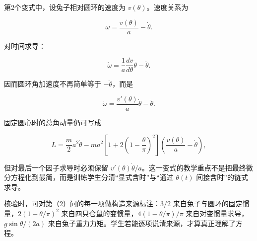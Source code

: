 \documentclass[12pt,a4paper,UTF8]{ctexart}
\begin{document}
第2个变式中，设兔子相对圆环的速度为 \(v(\theta)\)。速度关系为

\[\omega=\frac{v(\theta)}a-\dot\theta.\]

对时间求导：

\[\dot\omega
=\frac1a\frac{dv}{d\theta}\dot\theta-\ddot\theta.\]

因而圆环角加速度不再简单等于 \(-\ddot\theta\)，而是

\[\boxed{
\dot\omega=\frac{v'(\theta)}a\dot\theta-\ddot\theta
}.\]

固定圆心时的总角动量仍可写成

\[L=\frac m2a^2\dot\theta
-ma^2\left[1+2\left(1-\frac\theta\pi\right)^2\right]
\left(\frac{v(\theta)}a-\dot\theta\right),\]

但对最后一个因子求导时必须保留
\(v'(\theta)\dot\theta/a\)。这一变式的教学重点不是把最终微分方程化到最简，而是训练学生分清``显式含时''与``通过
\(\theta(t)\) 间接含时''的链式求导。

核验时，可对第（2）问的每一项做构造来源标注：\(3/2\)
来自兔子与圆环的固定惯量，\(2(1-\theta/\pi)^2\)
来自四只仓鼠的变惯量，\(4(1-\theta/\pi)/\pi\)
来自对变惯量求导，\(g\sin\theta/(2a)\)
来自兔子重力力矩。学生若能逐项说清来源，才算真正理解了方程。
\end{document}
